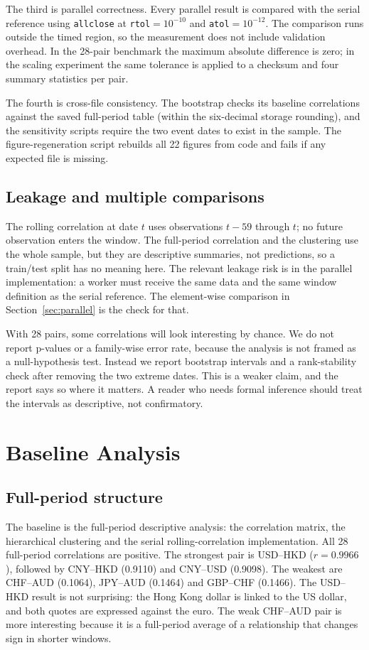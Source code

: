 \documentclass[journal]{IEEEtran}
\begin{document}
The third is parallel correctness. Every parallel result is compared with the serial reference using \texttt{allclose} at \texttt{rtol}$=10^{-10}$ and \texttt{atol}$=10^{-12}$. The comparison runs outside the timed region, so the measurement does not include validation overhead. In the 28-pair benchmark the maximum absolute difference is zero; in the scaling experiment the same tolerance is applied to a checksum and four summary statistics per pair.

The fourth is cross-file consistency. The bootstrap checks its baseline correlations against the saved full-period table (within the six-decimal storage rounding), and the sensitivity scripts require the two event dates to exist in the sample. The figure-regeneration script rebuilds all 22 figures from code and fails if any expected file is missing.

\subsection{Leakage and multiple comparisons}
The rolling correlation at date $t$ uses observations $t-59$ through $t$; no future observation enters the window. The full-period correlation and the clustering use the whole sample, but they are descriptive summaries, not predictions, so a train/test split has no meaning here. The relevant leakage risk is in the parallel implementation: a worker must receive the same data and the same window definition as the serial reference. The element-wise comparison in Section~\ref{sec:parallel} is the check for that.

With 28 pairs, some correlations will look interesting by chance. We do not report p-values or a family-wise error rate, because the analysis is not framed as a null-hypothesis test. Instead we report bootstrap intervals and a rank-stability check after removing the two extreme dates. This is a weaker claim, and the report says so where it matters. A reader who needs formal inference should treat the intervals as descriptive, not confirmatory.

\section{Baseline Analysis}
\label{sec:baseline}

\subsection{Full-period structure}
The baseline is the full-period descriptive analysis: the correlation matrix, the hierarchical clustering and the serial rolling-correlation implementation. All 28 full-period correlations are positive. The strongest pair is USD--HKD ($r = 0.9966$), followed by CNY--HKD (0.9110) and CNY--USD (0.9098). The weakest are CHF--AUD (0.1064), JPY--AUD (0.1464) and GBP--CHF (0.1466). The USD--HKD result is not surprising: the Hong Kong dollar is linked to the US dollar, and both quotes are expressed against the euro. The weak CHF--AUD pair is more interesting because it is a full-period average of a relationship that changes sign in shorter windows.
\end{document}
